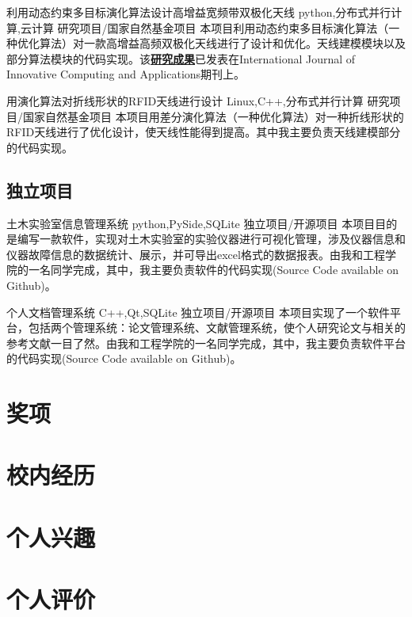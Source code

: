 \documentclass[11pt,a4paper,sans]{moderncv}   %
\begin{document}
\begin{CJK}{UTF8}{gbsn}
{利用动态约束多目标演化算法设计高增益宽频带双极化天线}
{python,分布式并行计算,云计算}
{研究项目/国家自然基金项目}{}
{本项目利用动态约束多目标演化算法（一种优化算法）对一款高增益高频双极化天线进行了设计和优化。天线建模模块以及部分算法模块的代码实现。该\textbf{\href{http://www.inderscienceonline.com/doi/abs/10.1504/IJICA.2014.064217?journalCode=ijica}{研究成果}}已发表在International Journal of Innovative Computing and Applications期刊上。}
\vspace*{0.2\baselineskip}

{用演化算法对折线形状的RFID天线进行设计}
{Linux,C++,分布式并行计算}
{研究项目/国家自然基金项目}{}
{本项目用差分演化算法（一种优化算法）对一种折线形状的RFID天线进行了优化设计，使天线性能得到提高。其中我主要负责天线建模部分的代码实现。}
\vspace*{0.2\baselineskip}

\subsection{独立项目}
{土木实验室信息管理系统}
{python,PySide,SQLite}
{独立项目/开源项目}{}
{本项目目的是编写一款软件，实现对土木实验室的实验仪器进行可视化管理，涉及仪器信息和仪器故障信息的数据统计、展示，并可导出excel格式的数据报表。由我和工程学院的一名同学完成，其中，我主要负责软件的代码实现(Source Code available on Github)。}
\vspace*{0.2\baselineskip}

{个人文档管理系统}
{C++,Qt,SQLite}
{独立项目/开源项目}{}
{本项目实现了一个软件平台，包括两个管理系统：论文管理系统、文献管理系统，使个人研究论文与相关的参考文献一目了然。由我和工程学院的一名同学完成，其中，我主要负责软件平台的代码实现(Source Code available on Github)。}
\vspace*{0.2\baselineskip}

\section{奖项}

\section{校内经历}

\section{个人兴趣}

\section{个人评价}

\renewcommand{\baselinestretch}{1.0} 
 
\closesection{}                   %
\renewcommand{\listitemsymbol}{-} %
\clearpage\end{CJK} 
\end{document}
